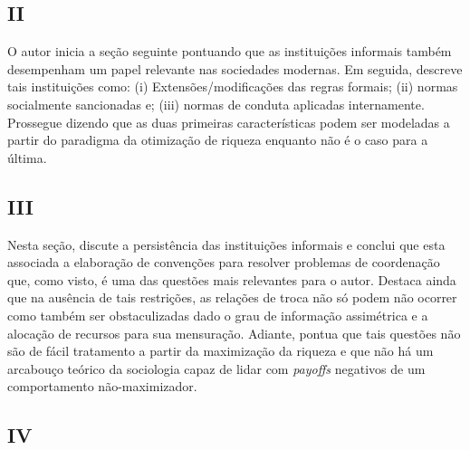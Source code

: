 \subsection*{II}

O autor inicia a seção seguinte pontuando que as instituições informais também desempenham um papel relevante nas sociedades modernas. Em seguida, descreve tais instituições como: (i) Extensões/modificações das regras formais; (ii) normas socialmente sancionadas e; (iii) normas de conduta aplicadas internamente. Prossegue dizendo que as duas primeiras características podem ser modeladas a partir do paradigma da otimização de riqueza enquanto não é o caso para a última.

\subsection*{III}

Nesta seção, \autor discute a persistência das instituições informais e conclui que esta associada a elaboração de convenções para resolver problemas de coordenação que, como visto, é uma das questões mais relevantes para o autor. Destaca ainda que na ausência de tais restrições, as relações de troca não só podem não ocorrer como também ser obstaculizadas dado o grau de informação assimétrica e a alocação de recursos para sua mensuração. Adiante, pontua que tais questões não são de fácil tratamento a partir da maximização da riqueza e que não há um arcabouço teórico da sociologia capaz de lidar com \textit{payoffs} negativos de um comportamento não-maximizador.

\subsection*{IV}

